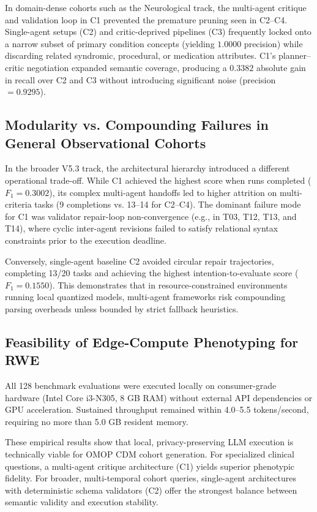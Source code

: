 In domain-dense cohorts such as the Neurological track, the multi-agent critique and validation loop in C1 prevented the premature pruning seen in C2--C4. Single-agent setups (C2) and critic-deprived pipelines (C3) frequently locked onto a narrow subset of primary condition concepts (yielding $1.0000$ precision) while discarding related syndromic, procedural, or medication attributes. C1's planner--critic negotiation expanded semantic coverage, producing a $0.3382$ absolute gain in recall over C2 and C3 without introducing significant noise (precision $= 0.9295$).

\subsection{Modularity vs. Compounding Failures in General Observational Cohorts}
In the broader V5.3 track, the architectural hierarchy introduced a different operational trade-off. While C1 achieved the highest score when runs completed ($F_1 = 0.3002$), its complex multi-agent handoffs led to higher attrition on multi-criteria tasks (9 completions vs. 13--14 for C2--C4). The dominant failure mode for C1 was validator repair-loop non-convergence (e.g., in T03, T12, T13, and T14), where cyclic inter-agent revisions failed to satisfy relational syntax constraints prior to the execution deadline.

Conversely, single-agent baseline C2 avoided circular repair trajectories, completing 13/20 tasks and achieving the highest intention-to-evaluate score ($F_1 = 0.1550$). This demonstrates that in resource-constrained environments running local quantized models, multi-agent frameworks risk compounding parsing overheads unless bounded by strict fallback heuristics.

\subsection{Feasibility of Edge-Compute Phenotyping for RWE}
All 128 benchmark evaluations were executed locally on consumer-grade hardware (Intel Core i3-N305, 8 GB RAM) without external API dependencies or GPU acceleration. Sustained throughput remained within 4.0--5.5 tokens/second, requiring no more than 5.0 GB resident memory.

These empirical results show that local, privacy-preserving LLM execution is technically viable for OMOP CDM cohort generation. For specialized clinical questions, a multi-agent critique architecture (C1) yields superior phenotypic fidelity. For broader, multi-temporal cohort queries, single-agent architectures with deterministic schema validators (C2) offer the strongest balance between semantic validity and execution stability.

